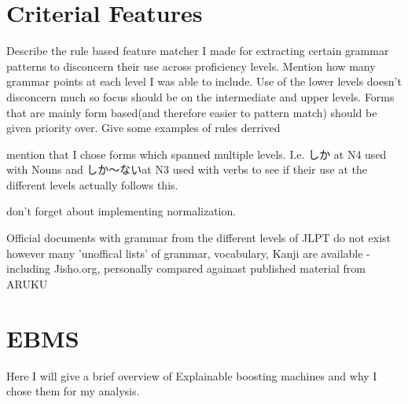 \section{Criterial Features}
Describe the rule based feature matcher I made for extracting certain grammar patterns to disconcern their use
across proficiency levels. Mention how many grammar points at each level I was able to include. Use of the lower
levels doesn't disconcern much so focus should be on the intermediate and upper levels.  Forms that are mainly form
based(and therefore easier to pattern match) should be given priority over. Give some examples of rules derrived

mention that I chose forms which spanned multiple levels. I.e. しか at N4 used with Nouns and しか〜ないat N3 used
with verbs to see if their use at the different levels actually follows this.

don't forget about implementing normalization.

Official documents with grammar from the different levels of JLPT do not exist however many 'unoffical lists' of
grammar, vocabulary, Kanji are available - including Jisho.org, personally compared againast published material from
ARUKU

\section{EBMS}
 Here I will give a brief overview of Explainable boosting machines and why I chose them for my analysis.


